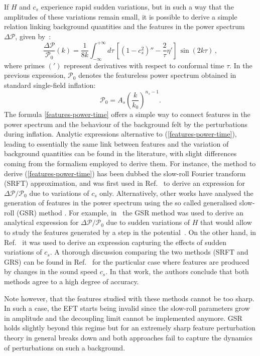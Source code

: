 \documentclass[12pt]{article}
\newcommand{\be}{\begin{equation}}
\newcommand{\ee}{\end{equation}}
\begin{document}
If $H$ and $c_s$ experience rapid sudden variations, but in such a way that the amplitudes of these variations remain small, it is possible to derive a simple relation linking background quantities and the features in the power spectrum $\Delta \mathcal P$, given by~\cite{Palma:2014hra}:
%
\be
\frac{\Delta \mathcal P}{\mathcal P_0 } (k) = \frac{1}{8 k} \int_{-\infty}^{+\infty} \!\!\!\!\! d \tau \, \left[ (1 - c_s^2)''  - \frac{2}{ \tau}  \eta '    \right] \, \sin (2 k \tau) \, , \label{features-power-time}
\ee
%
where primes $(')$ represent derivatives with respect to conformal time $\tau$. In the previous expression, ${\mathcal P_0 }$ denotes the featureless power spectrum obtained in standard single-field inflation:
%
\be 
{\mathcal P_0 } = A_s \left( \frac{k}{k_0}\right)^{n_s-1}.
\ee
%
The formula \eqref{features-power-time} offers a simple way to connect features in the power spectrum and the behaviour of the background felt by the perturbations during inflation. Analytic expressions alternative to (\ref{features-power-time}), leading to essentially the same link between features and the variation of background quantities can be found in the literature, with slight differences coming from the formalism employed to derive them. For instance, the method to derive (\ref{features-power-time}) has been dubbed the slow-roll Fourier transform (SRFT) approximation, and was first used in Ref.~\cite{Achucarro:2012fd} to derive an expression for $\Delta \mathcal P / \mathcal P_0$ due to variations of $c_s$ only. Alternatively, other works have analysed the generation of features in the power spectrum using the so called generalised slow-roll (GSR) method \cite{Choe:2004zg}. For example, in~\cite{Dvorkin:2009ne,Appleby:2015bpw} the GSR method was used to derive an analytical expression for $\Delta \mathcal P / \mathcal P_0$ due to sudden variations of $H$ that would allow to study the features generated by a step in the potential~\cite{Adshead:2011jq}. On the other hand, in Ref.~\cite{Achucarro:2014msa} it was used to derive an expression capturing the effects of sudden variations of $c_s$. A thorough discussion comparing the two methods (SRFT and GRS) can be found in Ref.~\cite{Achucarro:2014msa} for the particular case where features are produced by changes in the sound speed $c_s$. In that work, the authors conclude that both methods agree to a high degree of accuracy. 

Note however, that the features studied with these methods cannot be too sharp. In such a case, the EFT starts being invalid since the slow-roll parameters grow in amplitude and the decoupling limit cannot be implemented anymore. GSR holds slightly beyond this regime but for an extremely sharp feature perturbation theory in general breaks down and both approaches fail to capture the dynamics of perturbations on such a background.
\end{document}
